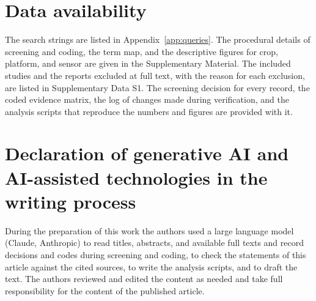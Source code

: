 \section*{Data availability}
The search strings are listed in Appendix~\ref{app:queries}. The procedural details of screening and coding, the term map, and the descriptive figures for crop, platform, and sensor are given in the Supplementary Material. The included studies and the reports excluded at full text, with the reason for each exclusion, are listed in Supplementary Data S1. The screening decision for every record, the coded evidence matrix, the log of changes made during verification, and the analysis scripts that reproduce the numbers and figures are provided with it.

\section*{Declaration of generative AI and AI-assisted technologies in the writing process}
During the preparation of this work the authors used a large language model (Claude, Anthropic) to read titles, abstracts, and available full texts and record decisions and codes during screening and coding, to check the statements of this article against the cited sources, to write the analysis scripts, and to draft the text. The authors reviewed and edited the content as needed and take full responsibility for the content of the published article.
